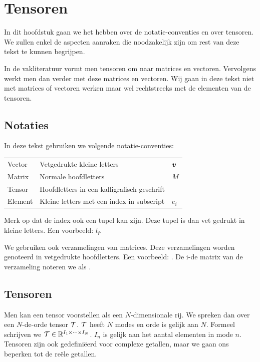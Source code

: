 \chapter{Tensoren}
\label{h:tensoren}
In dit hoofdstuk gaan we het hebben over de notatie-conventies en over tensoren. We zullen enkel de aspecten aanraken die noodzakelijk zijn om rest van deze tekst te kunnen begrijpen.

In de vakliteratuur vormt men tensoren om naar matrices en vectoren. Vervolgens werkt men dan verder met deze matrices en vectoren. Wij gaan in deze tekst niet met matrices of vectoren werken maar wel rechtstreeks met de elementen van de tensoren. 


\section{Notaties}
In deze tekst gebruiken we volgende notatie-conventies:

\begin{tabular}{l l l}
    Vector						& Vetgedrukte kleine letters					& $\boldsymbol{v}$\\
    Matrix 						& Normale hoofdletters							& $M$\\
    Tensor 						& Hoofdletters in een kalligrafisch geschrift	& \TT\\
    Element						& Kleine letters met een index in subscript	& $e_i$\\
\end{tabular}

Merk op dat de index ook een tupel kan zijn. Deze tupel is dan vet gedrukt in kleine letters. Een voorbeeld: $t_{\ii}$.

We gebruiken ook verzamelingen van matrices. Deze verzamelingen worden genoteerd in vetgedrukte hoofdletters. Een voorbeeld: \UUU{}. De i-de matrix van de verzameling \UUU{} noteren we als .

\section{Tensoren}
Men kan een tensor voorstellen als een $N$-dimensionale rij. We spreken dan over een $N$-de-orde tensor $\mathcal{T}$. $\mathcal{T}$ heeft $N$ modes en orde is gelijk aan $N$. Formeel schrijven we $\mathcal{T} \in \mathbb{R}^{I_1 \times \dotsb \times I_N}$. $I_n$ is gelijk aan het aantal elementen in mode $n$. Tensoren zijn ook gedefini\"eerd voor complexe getallen, maar we gaan ons beperken tot de re\"ele getallen.

